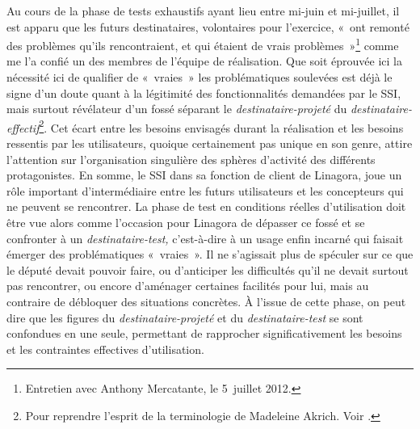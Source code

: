 \documentclass{FramateX}
\begin{document}
\begin{refsection}
Au cours de la phase de tests exhaustifs ayant lieu entre mi-juin et
mi-juillet, il est apparu que les futurs destinataires, volontaires
pour l'exercice,\textit{ }«~ont remonté des problèmes qu'ils
rencontraient, et qui étaient de vrais problèmes~»\footnote{Entretien
avec Anthony Mercatante, le 5~juillet 2012.} comme me l'a
confié un des membres de l'équipe de réalisation. Que soit éprouvée ici
la nécessité ici de qualifier de «~vraies~» les problématiques
soulevées est déjà le signe d'un doute quant à la légitimité des
fonctionnalités demandées par le SSI, mais surtout révélateur d'un
fossé séparant le \textit{destinataire-projeté} du
\textit{destinataire-effectif}\footnote{Pour reprendre l'esprit de la
terminologie de Madeleine Akrich. Voir \cite{Akrich1987}.}. Cet écart entre les besoins envisagés durant
la réalisation et les besoins ressentis par les utilisateurs, quoique
certainement pas unique en son genre, attire l'attention sur
l'organisation singulière des sphères d'activité des différents
protagonistes. En somme, le SSI dans sa fonction de client de Linagora,
joue un rôle important d'intermédiaire entre les futurs utilisateurs et
les concepteurs qui ne peuvent se rencontrer. La phase de test en
conditions réelles d'utilisation doit être vue alors comme l'occasion
pour Linagora de dépasser ce fossé et se confronter à un
\textit{destinataire-test,} c'est-à-dire à un usage enfin incarné qui
faisait émerger des problématiques «~vraies~». Il ne s'agissait plus de
spéculer sur ce que le député devait pouvoir faire, ou d'anticiper les
difficultés qu'il ne devait surtout pas rencontrer, ou encore
d'aménager certaines facilités pour lui, mais au contraire de débloquer
des situations concrètes. À l'issue de cette phase, on peut dire que
les figures du \textit{destinataire-projeté} et du
\textit{destinataire-test} se sont confondues en une seule, permettant
de rapprocher significativement les besoins et les contraintes
effectives d'utilisation. 


\end{refsection}
\end{document}
